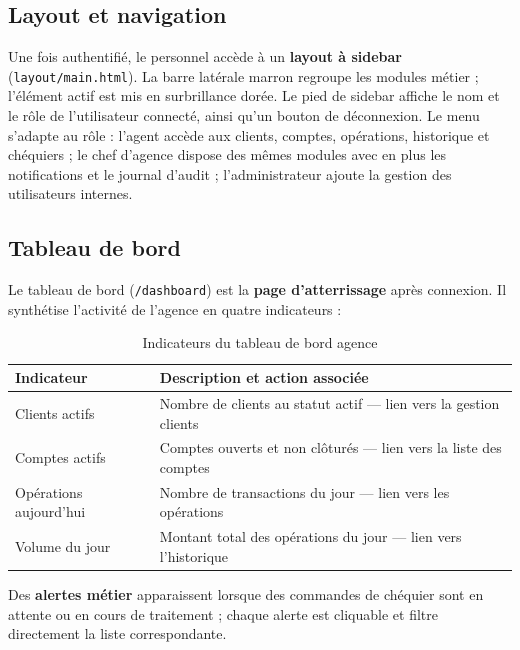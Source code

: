 \documentclass[11pt,a4paper,oneside]{report}
\begin{document}
\subsection{Layout et navigation}

Une fois authentifié, le personnel accède à un \textbf{layout à sidebar} (\texttt{layout/main.html}). La barre latérale marron regroupe les modules métier ; l'élément actif est mis en surbrillance dorée. Le pied de sidebar affiche le nom et le rôle de l'utilisateur connecté, ainsi qu'un bouton de déconnexion. Le menu s'adapte au rôle : l'agent accède aux clients, comptes, opérations, historique et chéquiers ; le chef d'agence dispose des mêmes modules avec en plus les notifications et le journal d'audit ; l'administrateur ajoute la gestion des utilisateurs internes.

\subsection{Tableau de bord}

Le tableau de bord (\texttt{/dashboard}) est la \textbf{page d'atterrissage} après connexion. Il synthétise l'activité de l'agence en quatre indicateurs :

\begin{table}[H]
    \centering
    \caption{Indicateurs du tableau de bord agence}
    \label{tab:kpi-agence}
    \small
    \begin{tabular}{@{}lp{8cm}@{}}
        \rowcolor{AmanaBrown}
        \color{white}\textbf{Indicateur} & \textbf{Description et action associée} \\
        \midrule
        Clients actifs & Nombre de clients au statut actif — lien vers la gestion clients \\
        Comptes actifs & Comptes ouverts et non clôturés — lien vers la liste des comptes \\
        Opérations aujourd'hui & Nombre de transactions du jour — lien vers les opérations \\
        Volume du jour & Montant total des opérations du jour — lien vers l'historique \\
        \bottomrule
    \end{tabular}
\end{table}

Des \textbf{alertes métier} apparaissent lorsque des commandes de chéquier sont en attente ou en cours de traitement ; chaque alerte est cliquable et filtre directement la liste correspondante.
\end{document}
